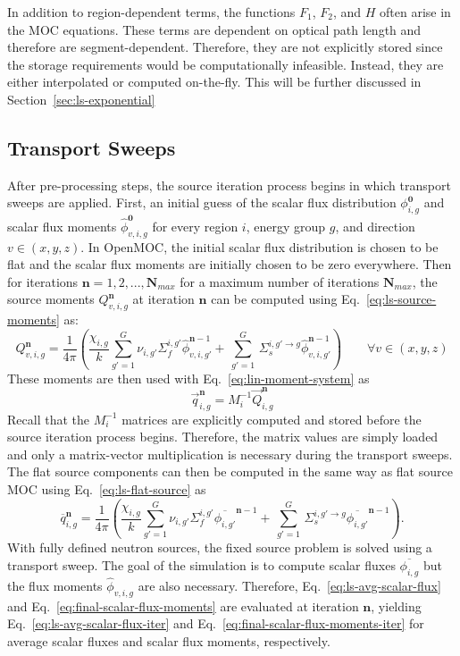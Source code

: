 In addition to region-dependent terms, the functions $F_1$, $F_2$, and $H$ often arise in the \ac{MOC} equations. These terms are dependent on optical path length and therefore are segment-dependent. Therefore, they are not explicitly stored since the storage requirements would be computationally infeasible. Instead, they are either interpolated or computed on-the-fly. This will be further discussed in Section~\ref{sec:ls-exponential}

\subsection{Transport Sweeps}

After pre-processing steps, the source iteration process begins in which transport sweeps are applied. First, an initial guess of the scalar flux distribution $\phi_{i,g}^{\mathbf{0}}$ and scalar flux moments $\hat{\phi}_{v,i,g}^{\mathbf{0}}$ for every region $i$, energy group $g$, and direction $v \in (x,y,z)$. In OpenMOC, the initial scalar flux distribution is chosen to be flat and the scalar flux moments are initially chosen to be zero everywhere. Then for iterations $\mathbf{n} = 1,2,...,\mathbf{N_{\textit{max}}}$ for a maximum number of iterations $\mathbf{N_{\textit{max}}}$, the source moments $Q_{v,i,g}^{\mathbf{n}}$ at iteration $\mathbf{n}$ can be computed using Eq.~\ref{eq:ls-source-moments} as:
\begin{equation}
Q_{v,i,g}^{\mathbf{n}} = \frac{1}{4 \pi} \left( \frac{\chi_{i,g}}{k} \sum_{g'=1}^{G} \nu_{i,g'} \Sigma_f^{i,g'} \hat{\phi}_{v,i,g'}^{\mathbf{n}-1} + \, \sum_{g'=1}^G \,  \Sigma_{s}^{i,g' \rightarrow g} \hat{\phi}_{v,i,g'}^{\mathbf{n}-1} \right) \qquad \forall v \in (x,y,z)
\end{equation}
These moments are then used with Eq.~\ref{eq:lin-moment-system} as
\begin{equation}
\vec{q}_{i,g}^{\mathbf{n}} = M_i^{-1} \vec{Q}_{i,g}^{\mathbf{n}}
\end{equation}
Recall that the $M_i^{-1}$ matrices are explicitly computed and stored before the source iteration process begins. Therefore, the matrix values are simply loaded and only a matrix-vector multiplication is necessary during the transport sweeps. The flat source components can then be computed in the same way as flat source \ac{MOC} using Eq.~\ref{eq:ls-flat-source} as
\begin{equation}
\overline{q}_{i,g}^{\mathbf{n}} = \frac{1}{4 \pi} \left( \frac{\chi_{i,g}}{k} \sum_{g'=1}^{G} \nu_{i,g'} \Sigma_f^{i,g'} \overline{\phi_{i,g'}}^{\mathbf{n}-1} + \, \sum_{g'=1}^G \,  \Sigma_{s}^{i,g' \rightarrow g} \overline{\phi_{i,g'}}^{\mathbf{n}-1} \right).
\end{equation}
With fully defined neutron sources, the fixed source problem is solved using a transport sweep. The goal of the simulation is to compute scalar fluxes $\overline{\phi_{i,g}}$ but the flux moments $\hat{\phi}_{v,i,g}$ are also necessary. Therefore, Eq.~\ref{eq:ls-avg-scalar-flux} and Eq.~\ref{eq:final-scalar-flux-moments} are evaluated at iteration $\mathbf{n}$, yielding Eq.~\ref{eq:ls-avg-scalar-flux-iter} and Eq.~\ref{eq:final-scalar-flux-moments-iter} for average scalar fluxes and scalar flux moments, respectively. 

